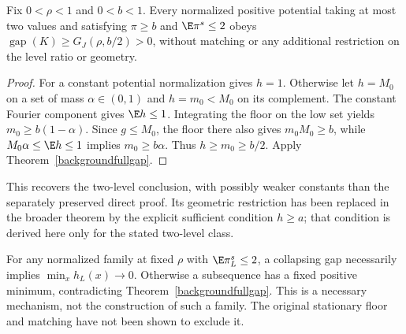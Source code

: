 \begin{corollary}\label{twolevelfullgap}
Fix $0<\rho<1$ and $0<b<1$. Every normalized positive potential taking
at most two values and satisfying $\pi\geq b$ and $\E\pi^s\leq2$ obeys
$\operatorname{gap}(K)\geq G_J(\rho,b/2)>0$, without matching or any
additional restriction on the level ratio or geometry.
\end{corollary}
\begin{proof}
For a constant potential normalization gives $h=1$.
Otherwise let $h=M_0$ on a set of mass $\alpha\in(0,1)$ and $h=m_0<M_0$
on its complement. The constant Fourier component gives $\E h\leq1$.
Integrating the floor on the low set yields $m_0\geq b(1-\alpha)$.
Since $g\leq M_0$, the floor there also gives $m_0M_0\geq b$, while
$M_0\alpha\leq\E h\leq1$ implies $m_0\geq b\alpha$.
Thus $h\geq m_0\geq b/2$. Apply Theorem~\ref{backgroundfullgap}.
\end{proof}
This recovers the two-level conclusion, with possibly weaker constants
than the separately preserved direct proof. Its geometric restriction
has been replaced in the broader theorem by the explicit sufficient
condition $h\geq a$; that condition is derived here only for the
stated two-level class.

For any normalized family at fixed $\rho$ with $\E\pi_L^s\leq2$, a
collapsing gap necessarily implies $\min_x h_L(x)\to0$.
Otherwise a subsequence has a fixed positive minimum, contradicting
Theorem~\ref{backgroundfullgap}. This is a necessary mechanism,
not the construction of such a family. The original stationary floor
and matching have not been shown to exclude it.
